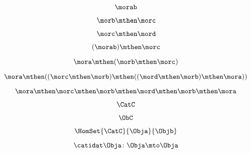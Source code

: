 \begin{forslides}
        \begin{equation}
            \label{eq:08}
            \morab
        \end{equation}

        \begin{equation}
            \label{eq:09}
            \morb \mthen \morc
        \end{equation}

        \begin{equation}
            \label{eq:10}
            \morc \mthen \mord
        \end{equation}

        \begin{equation}
            \label{eq:11}
            (\morab) \mthen \morc
        \end{equation}

        \begin{equation}
            \label{eq:12}
            \mora \mthen  (\morb \mthen \morc )
        \end{equation}

        \begin{equation}
            \label{eq:13}
            \mora \mthen  ((\morc \mthen \morb ) \mthen (( \mord \mthen \morb ) \mthen \mora ))
        \end{equation}

        \begin{equation}
            \label{eq:14}
            \mora \mthen  \morc \mthen \morb  \mthen \mord \mthen \morb  \mthen \mora
        \end{equation}
        
        \begin{equation}
            \label{eq:15}
            \CatC
        \end{equation}

        \begin{equation}
            \label{eq:16}
            \ObC
        \end{equation}

        \begin{equation}
            \label{eq:17}
            \HomSet{\CatC}{\Obja}{\Objb}
        \end{equation}

        \begin{equation}
            \label{eq:18}
            \catidat\Obja\colon \Obja \mto \Obja
        \end{equation}


\end{forslides}
